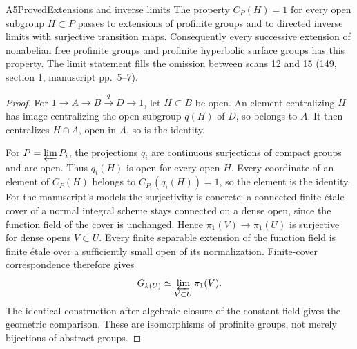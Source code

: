 \begin{result}{A5}{Proved}{Extensions and inverse limits}
\label{res:A5}
The property $C_P(H)=1$ for every open subgroup $H\subset P$ passes to
extensions of profinite groups and to directed inverse limits with
surjective transition maps. Consequently every successive extension of
nonabelian free profinite groups and profinite hyperbolic surface groups
has this property. The limit statement fills the omission between scans
12 and 15 (149, section 1, manuscript pp.~5--7).
\end{result}
\begin{proof}
For $1\to A\to B\xrightarrow q D\to1$, let $H\subset B$ be open.
An element centralizing $H$ has image centralizing the open subgroup
$q(H)$ of $D$, so belongs to $A$. It then centralizes $H\cap A$, open
in $A$, so is the identity.

For $P=\varprojlim P_i$, the projections $q_i$ are continuous surjections
of compact groups and are open. Thus $q_i(H)$ is open for every open $H$.
Every coordinate of an element of $C_P(H)$ belongs to
$C_{P_i}(q_i(H))=1$, so the element is the identity.
For the manuscript's models the surjectivity is concrete: a connected
finite \'etale cover of a normal integral scheme stays connected on a
dense open, since the function field of the cover is unchanged. Hence
$\pi_1(V)\to\pi_1(U)$ is surjective for dense opens $V\subset U$.
Every finite separable extension of the function field is finite \'etale
over a sufficiently small open of its normalization. Finite-cover
correspondence therefore gives
\[
 G_{k(U)}\simeq\varprojlim_{V\subset U}\pi_1(V).
\]
The identical construction after algebraic closure of the constant field
gives the geometric comparison. These are isomorphisms of profinite
groups, not merely bijections of abstract groups.
\end{proof}

